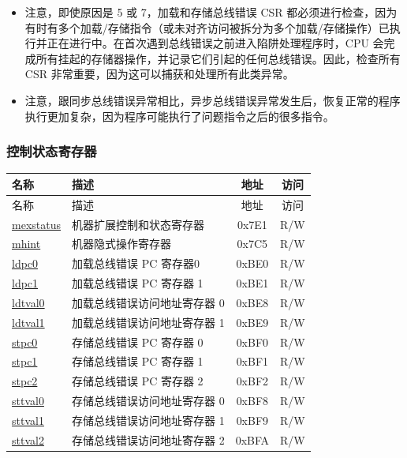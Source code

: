 \documentclass[main\_\_CN.tex]{subfiles}
\begin{document}
\begin{itemize}
\begin{itemize}
    \item 注意，即使原因是 5 或 7，加载和存储总线错误 CSR 都必须进行检查，因为有时有多个加载/存储指令（或未对齐访问被拆分为多个加载/存储操作）已执行并正在进行中。在首次遇到总线错误之前进入陷阱处理程序时，CPU 会完成所有挂起的存储器操作，并记录它们引起的任何总线错误。因此，检查所有 CSR 非常重要，因为这可以捕获和处理所有此类异常。\\
    \item 注意，跟同步总线错误异常相比，异步总线错误异常发生后，恢复正常的程序执行更加复杂，因为程序可能执行了问题指令之后的很多指令。
    \end{itemize}
\end{itemize}

\subsubsection{控制状态寄存器}
\label{sec:riscvcpu-buserr-csr}

\begin{longtable}{ | p{4.0cm} | p{8.4cm} | c | c| }
\hline\rowcolor{lightgray}
名称 & 描述 & 地址 & 访问 \\ \hline
\endfirsthead
\hline
\rowcolor{lightgray}
名称 & 描述 & 地址 & 访问  \\
\hline
\endhead
\endfoot

\hyperref[regdesc:MEXSTATUS]{mexstatus} & 机器扩展控制和状态寄存器 & 0x7E1 & R/W \\\hline
\hyperref[regdesc:MHINT]{mhint} & 机器隐式操作寄存器 & 0x7C5 & R/W \\\hline
\hyperref[regdesc:LDPC0]{ldpc0} & 加载总线错误 PC 寄存器0 & 0xBE0 & R/W \\\hline
\hyperref[regdesc:LDPC1]{ldpc1} & 加载总线错误 PC 寄存器 1 & 0xBE1 & R/W \\\hline
\hyperref[regdesc:LDTVAL0]{ldtval0} & 加载总线错误访问地址寄存器 0 & 0xBE8 & R/W \\\hline
\hyperref[regdesc:LDTVAL1]{ldtval1} & 加载总线错误访问地址寄存器 1 & 0xBE9 & R/W \\\hline
\hyperref[regdesc:STPC0]{stpc0} & 存储总线错误 PC 寄存器 0 & 0xBF0 & R/W \\\hline
\hyperref[regdesc:STPC1]{stpc1} & 存储总线错误 PC 寄存器 1 & 0xBF1 & R/W \\\hline
\hyperref[regdesc:STPC2]{stpc2} & 存储总线错误 PC 寄存器 2 & 0xBF2 & R/W \\\hline
\hyperref[regdesc:STTVAL0]{sttval0} & 存储总线错误访问地址寄存器 0 & 0xBF8 & R/W \\\hline
\hyperref[regdesc:STTVAL1]{sttval1} & 存储总线错误访问地址寄存器 1 & 0xBF9 & R/W \\\hline
\hyperref[regdesc:STTVAL2]{sttval2} & 存储总线错误访问地址寄存器 2 & 0xBFA & R/W \\\hline
\end{longtable}
\end{document}
